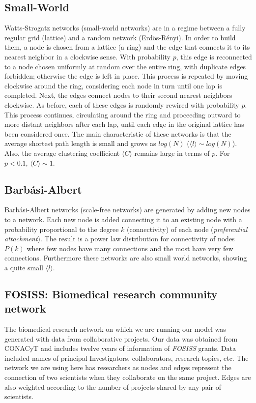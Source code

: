 \documentclass{bmcart}
\begin{document}
\subsection*{Small-World}

Watts-Strogatz networks \cite{WattsStrogatz:98} (small-world networks)
are in a regime between a fully regular grid (lattice) and a random
network (Erd\"{o}s-R\'enyi). In order to build them, a node is chosen
from a lattice (a ring) and the edge that connects it to its nearest
neighbor in a clockwise sense. With probability $p$, this edge is
reconnected to a node chosen uniformly at random over the entire ring,
with duplicate edges forbidden; otherwise the edge is left in
place. This process is repeated by moving clockwise around the ring,
considering each node in turn until one lap is completed. Next, the
edges connect nodes to their second nearest neighbors clockwise. As
before, each of these edges is randomly rewired with probability
$p$. This process continues, circulating around the ring and
proceeding outward to more distant neighbors after each lap, until
each edge in the original lattice has been considered once. The main
characteristic of these networks is that the average shortest path
length is small and grows as $log(N)$
($\langle l \rangle \sim log(N)$). Also, the average clustering
coefficient $\langle C \rangle$ remains large in terms of $p$. For
$p < 0.1$, $\langle C \rangle \sim 1$.

\subsection*{Barb\'asi-Albert}

Barb\'asi-Albert networks \cite{BarabasiAlbert:99} (scale-free
networks) are generated by adding new nodes to a network. Each new
node is added connecting it to an existing node with a probability
proportional to the degree $k$ (connectivity) of each node
(\textit{preferential attachment}). The result is a power law
distribution for connectivity of nodes $P(k)$ where few nodes have
many connections and the most have very few connections. Furthermore
these networks are also small world networks, showing a quite small
$\langle l \rangle$.


\subsection*{FOSISS: Biomedical research community network}

The biomedical research network on which we are running our model was
generated with data from collaborative projects. Our data was obtained
from CONACyT and includes twelve years of information of
\textit{FOSISS} grants. Data included names of principal
Investigators, collaborators, research topics, etc. The network we are
using here has researchers as nodes and edges represent the connection
of two scientists when they collaborate on the same project. Edges are
also weighted according to the number of projects shared by any pair
of scientists.
\end{document}

